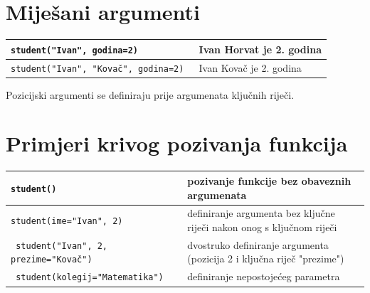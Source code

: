 \documentclass[10pt]{article}
\begin{document}
    \section*{\color{NavyBlue} Miješani argumenti}
    \begin{tabular}{|>{\tt}p{9.00cm}|>{}p{15.50cm}|}
        \hline
        student("Ivan", godina=2)                   & Ivan Horvat je 2. godina \\ \hline
        student("Ivan", "Kovač", godina=2)          & Ivan Kovač je 2. godina \\ \hline
    \end{tabular}
    \begin{center}
        \footnotesize
        Pozicijski argumenti se definiraju prije argumenata ključnih riječi. \\
    \end{center}

    \section*{\color{NavyBlue} Primjeri krivog pozivanja funkcija}
    \begin{tabular}{|>{\tt}p{9.00cm}|>{}p{15.50cm}|}
        \hline
        student()                               & pozivanje funkcije bez obaveznih argumenata \\ \hline
        student(ime="Ivan", 2)                  & definiranje argumenta bez ključne riječi nakon onog s ključnom riječi \\ \hline
        student("Ivan", 2, prezime="Kovač")     & dvostruko definiranje argumenta (pozicija 2 i ključna riječ "prezime") \\ \hline
        student(kolegij="Matematika")           & definiranje nepostojećeg parametra \\ \hline
    \end{tabular}
\end{document}
